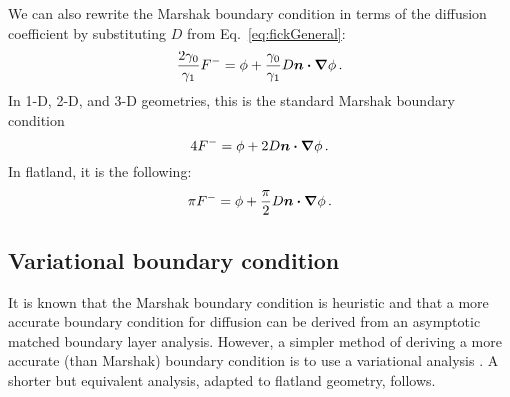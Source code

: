 We can also rewrite the Marshak boundary condition in terms of the diffusion
coefficient by substituting $D$ from Eq.~\eqref{eq:fickGeneral}:
\begin{equation*}
\frac{2\gamma_0}{\gamma_1} F^{-}
= \phi + \frac{\gamma_0}{\gamma_1} D \bm{n} \bm{\cdot} \bm{\nabla} \phi\,.
\end{equation*}
In 1-D, 2-D, and 3-D geometries, this is the standard Marshak boundary condition
\begin{equation*}
4 F^{-}
= \phi + 2 D \bm{n} \bm{\cdot} \bm{\nabla} \phi\,.
\end{equation*}
In flatland, it is the following:
\begin{equation}\label{eq:flatMarshak}
\pi F^{-}
= \phi + \frac{\pi}{2} D \bm{n} \bm{\cdot} \bm{\nabla} \phi\,.
\end{equation}

\subsection{Variational boundary condition} \label{sec:varBndy}
It is known that the Marshak boundary condition is heuristic and that
a more accurate boundary condition for diffusion can be derived from an
asymptotic matched boundary layer analysis. However, a simpler
method of deriving a more accurate (than Marshak) boundary condition is to use
a variational analysis \cite{Mal1991}.
A shorter but equivalent analysis, adapted to flatland geometry, follows.

%

